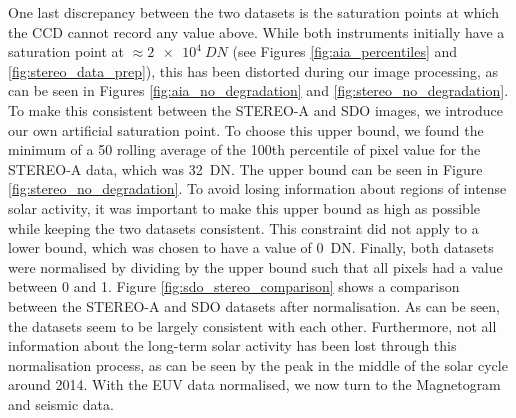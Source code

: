 \documentclass[11pt,a4paper,onecolumn]{report}
\begin{document}
One last discrepancy between the two datasets is the saturation points at which
the CCD cannot record any value above. While both instruments initially have a
saturation point at $\approx \SI[]{2e4}[]{DN}$ (see Figures
\ref{fig:aia_percentiles} and \ref{fig:stereo_data_prep}), this has been
distorted during our image processing, as can be seen in Figures
\ref{fig:aia_no_degradation} and \ref{fig:stereo_no_degradation}. To make this
consistent between the STEREO-A and SDO images, we introduce our own artificial
saturation point. To choose this upper bound, we found the minimum of a 50
rolling average of the 100th percentile of pixel value for the STEREO-A data,
which was \SI[]{32}[]{DN}. The upper bound can be seen in Figure
\ref{fig:stereo_no_degradation}. To avoid losing information about regions of
intense solar activity, it was important to make this upper bound as high as
possible while keeping the two datasets consistent. This constraint did not
apply to a lower bound, which was chosen to have a value of \SI{0}{DN}. Finally,
both datasets were normalised by dividing by the upper bound such that all pixels
had a value between 0 and 1. Figure \ref{fig:sdo_stereo_comparison} shows a
comparison between the STEREO-A and SDO datasets after normalisation. As can be
seen, the datasets seem to be largely consistent with each other. Furthermore,
not all information about the long-term solar activity has been lost through
this normalisation process, as can be seen by the peak in the middle of the
solar cycle around 2014. With the EUV data normalised, we now turn to
the Magnetogram and seismic data.
\end{document}
